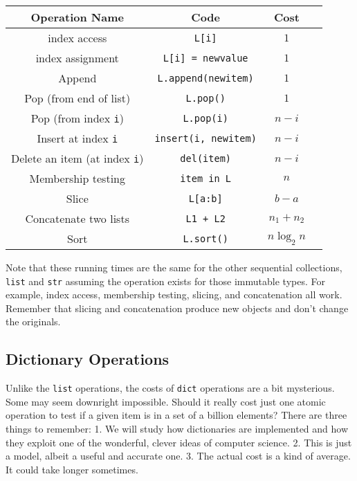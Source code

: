 \begin{tabular}{c c c c}

\hline


Operation Name & 
Code & 
Cost & 
\\
\hline



index access &
\texttt{L[i]} &
$1$ &
\\

index assignment &
\texttt{L[i] = newvalue} &
$1$ &
\\

Append &
\texttt{L.append(newitem)} &
$1$ &
\\

Pop (from end of list) &
\texttt{L.pop()} &
$1$ &
\\

Pop (from index \texttt{i}) &
\texttt{L.pop(i)} &
$n - i$ &
\\

Insert at index \texttt{i} &
\texttt{insert(i, newitem)} &
$n-i$ &
\\

Delete an item (at index \texttt{i}) &
\texttt{del(item)} &
$n - i$ &
\\

Membership testing &
\texttt{item in L} &
$n$ &
\\

Slice &
\texttt{L[a:b]} &
$b-a$ &
\\

Concatenate two lists &
\texttt{L1 + L2} &
$n_1 + n_2$ &
\\

Sort &
\texttt{L.sort()} &
$n \log_2 n$ &
\\
\hline
\end{tabular}

Note that these running times are the same for the other sequential collections, \texttt{list} and \texttt{str} assuming the operation exists for those immutable types.
For example, index access, membership testing, slicing, and concatenation all work.
Remember that slicing and concatenation produce new objects and don't change the originals.

\subsection{Dictionary Operations}


Unlike the \texttt{list} operations, the costs of \texttt{dict} operations are a bit mysterious.
Some may seem downright impossible.
Should it really cost just one atomic operation to test if a given item is in a set of a billion elements?
There are three things to remember:
  1. We will study how dictionaries are implemented and how they exploit one of the wonderful, clever ideas of computer science.
  2. This is just a model, albeit a useful and accurate one.
  3. The actual cost is a kind of average.  It could take longer sometimes.


